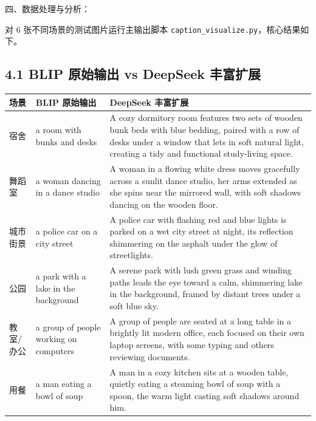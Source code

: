 \documentclass[12pt, a4paper]{article}
\begin{document}
\newpage
\begin{labbox}{四、数据处理与分析：}{}

对 6 张不同场景的测试图片运行主输出脚本 \texttt{caption\_visualize.py}，核心结果如下。

\subsection*{4.1 BLIP 原始输出 vs DeepSeek 丰富扩展}

\begin{center}
\small
\begin{tabular}{|p{2.5cm}|p{4.5cm}|p{8cm}|}
    \hline
    \textbf{场景} & \textbf{BLIP 原始输出} & \textbf{DeepSeek 丰富扩展} \\
    \hline
    宿舍 &
    a room with bunks and desks &
    A cozy dormitory room features two sets of wooden bunk beds with blue bedding, paired with a row of desks under a window that lets in soft natural light, creating a tidy and functional study-living space. \\
    \hline
    舞蹈室 &
    a woman dancing in a dance studio &
    A woman in a flowing white dress moves gracefully across a sunlit dance studio, her arms extended as she spins near the mirrored wall, with soft shadows dancing on the wooden floor. \\
    \hline
    城市街景 &
    a police car on a city street &
    A police car with flashing red and blue lights is parked on a wet city street at night, its reflection shimmering on the asphalt under the glow of streetlights. \\
    \hline
    公园 &
    a park with a lake in the background &
    A serene park with lush green grass and winding paths leads the eye toward a calm, shimmering lake in the background, framed by distant trees under a soft blue sky. \\
    \hline
    教室/办公 &
    a group of people working on computers &
    A group of people are seated at a long table in a brightly lit modern office, each focused on their own laptop screens, with some typing and others reviewing documents. \\
    \hline
    用餐 &
    a man eating a bowl of soup &
    A man in a cozy kitchen sits at a wooden table, quietly eating a steaming bowl of soup with a spoon, the warm light casting soft shadows around him. \\
    \hline
\end{tabular}
\end{center}


\end{labbox}
\end{document}
